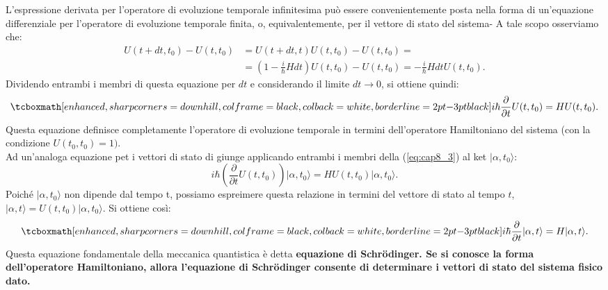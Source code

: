 L'espressione derivata per l'operatore di evoluzione temporale infinitesima può essere convenientemente posta nella forma di un'equazione differenziale per l'operatore di evoluzione temporale finita, o, equivalentemente, per il vettore di stato del sistema- A tale scopo osserviamo che:
	\begin{align}
		U(t+dt,t_0)-U(t,t_0)&=  U(t+dt,t)U(t,t_0)-U(t,t_0)= \nonumber\\
		& =\left(1-\frac{i}{\hbar}Hdt \right)U(t,t_0)-U(t,t_0)=-\frac{i}{\hbar}Hdt U(t,t_0).
	\end{align}
Dividendo entrambi i membri di questa equazione per $dt$ e considerando il limite $dt \longrightarrow 0$, si ottiene quindi:
	\begin{equation}
		\tcboxmath[enhanced, sharp corners=downhill, colframe=black, colback=white, borderline={2pt}{-3pt}{black}]{
			i\hbar \frac{\partial}{\partial t} U (t, t_0)= H U(t,t_0).
			}
	\label{eq:cap8_3}
	\end{equation}
Questa equazione definisce completamente l'operatore di evoluzione temporale in termini dell'operatore Hamiltoniano del sistema (con la condizione $U(t_0,t_0)=1).$\\

Ad un'analoga equazione pet i vettori di stato di giunge applicando entrambi i membri della (\ref{eq:cap8_3}) al ket $\vert \alpha, t_0\rangle$:
	\begin{equation}
		i\hbar \left( \frac{\partial}{\partial t} U (t,t_0) \right) \vert \alpha, t_0\rangle= H U(t, t_0)\vert \alpha, t_0\rangle.
	\end{equation}
Poiché $\vert \alpha, t_0\rangle$ non dipende dal tempo t, possiamo espreimere questa relazione in termini del vettore di stato al tempo $t$, $\vert \alpha, t\rangle= U(t,t_0)\vert \alpha, t_0\rangle$. Si ottiene così:
	\begin{equation}
		\tcboxmath[enhanced, sharp corners=downhill, colframe=black, colback=white, borderline={2pt}{-3pt}{black}]{
		i\hbar \frac{\partial}{\partial t} \vert \alpha, t \rangle = H \vert \alpha, t \rangle.
		}
	\end{equation}
Questa equazione fondamentale della meccanica quantistica è detta \textbf{equazione di Schr\"{o}dinger. Se si conosce la forma dell'operatore Hamiltoniano, allora l'equazione di Schr\"{o}dinger consente di determinare i vettori di stato del sistema fisico dato.}
